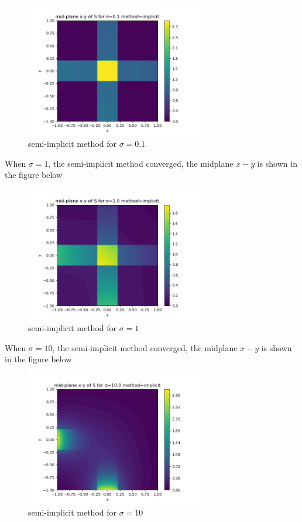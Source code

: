 \begin{figure}[H]
	\caption{semi-implicit method for $\sigma = 0.1$}
	\centering
	\includegraphics[width=0.7\textwidth]{i_0.1}
\end{figure}

When $\sigma = 1$, the semi-implicit method converged, the midplane $x-y$ is shown in the figure below

\begin{figure}[H]
	\caption{semi-implicit method for $\sigma = 1$}
	\centering
	\includegraphics[width=0.7\textwidth]{i_1}
\end{figure}

When $\sigma = 10$, the semi-implicit method converged, the midplane $x-y$ is shown in the figure below

\begin{figure}[H]
	\caption{semi-implicit method for $\sigma = 10$}
	\centering
	\includegraphics[width=0.7\textwidth]{i_10}
\end{figure}

